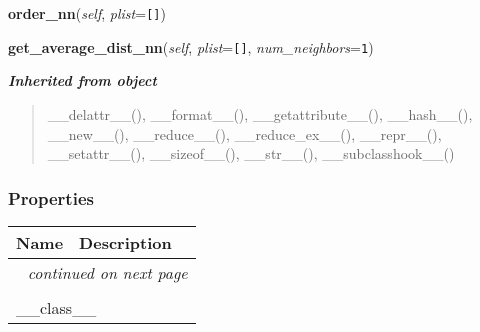     \label{Tiling:Point:order_nn}

    \vspace{0.5ex}

\hspace{.8\funcindent}\begin{boxedminipage}{\funcwidth}

    \raggedright \textbf{order\_nn}(\textit{self}, \textit{plist}={\tt []})

\setlength{\parskip}{2ex}
\setlength{\parskip}{1ex}
    \end{boxedminipage}

    \label{Tiling:Point:get_average_dist_nn}

    \vspace{0.5ex}

\hspace{.8\funcindent}\begin{boxedminipage}{\funcwidth}

    \raggedright \textbf{get\_average\_dist\_nn}(\textit{self}, \textit{plist}={\tt []}, \textit{num\_neighbors}={\tt 1})

\setlength{\parskip}{2ex}
\setlength{\parskip}{1ex}
    \end{boxedminipage}


\large{\textbf{\textit{Inherited from object}}}

\begin{quote}
\_\_delattr\_\_(), \_\_format\_\_(), \_\_getattribute\_\_(), \_\_hash\_\_(), \_\_new\_\_(), \_\_reduce\_\_(), \_\_reduce\_ex\_\_(), \_\_repr\_\_(), \_\_setattr\_\_(), \_\_sizeof\_\_(), \_\_str\_\_(), \_\_subclasshook\_\_()
\end{quote}


  \subsubsection{Properties}

    \vspace{-1cm}
\hspace{\varindent}\begin{longtable}{|p{\varnamewidth}|p{\vardescrwidth}|l}
\cline{1-2}
\cline{1-2} \centering \textbf{Name} & \centering \textbf{Description}& \\
\cline{1-2}
\endhead\cline{1-2}\multicolumn{3}{r}{\small\textit{continued on next page}}\\\endfoot\cline{1-2}
\endlastfoot\multicolumn{2}{|l|}{\textit{Inherited from object}}\\
\multicolumn{2}{|p{\varwidth}|}{\raggedright \_\_class\_\_}\\
\cline{1-2}
\end{longtable}

